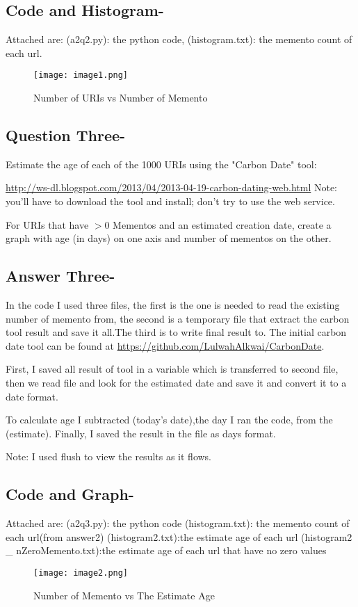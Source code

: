 \documentclass[letterpaper,11pt]{article}
\begin{document}
\subsection*{Code and Histogram-}
Attached are:
(a2q2.py): the python code,
(histogram.txt): the memento count of each url.
\pagebreak

\begin{figure}[!ht]
\centering
\texttt{[image: image1.png]}
\caption{Number of URIs vs Number of Memento}
\label{fig:Number of URIs vs Number of Memento}
\end{figure}


\pagebreak
\subsection*{Question Three-}

Estimate the age of each of the 1000 URIs using the "Carbon Date" tool:

\url{http://ws-dl.blogspot.com/2013/04/2013-04-19-carbon-dating-web.html}
Note: you'll have to download the tool and install; don't try to use the 
web service.  

For URIs that have $> 0$ Mementos and an estimated creation date,
create a graph with age (in days) on one axis and number of mementos
on the other.

\subsection*{Answer Three-}

In the code I used three files, the first is the one is needed to read the existing number of memento from, the second is a temporary file that extract the carbon tool result and save it all.The third is to write final result to.
The initial carbon date tool can be found at \url{https://github.com/LulwahAlkwai/CarbonDate}.

First, I saved all result of tool in a variable which is transferred to second file, then we read file and look for the estimated date and save it and convert it to a date format.

To calculate age I subtracted (today's date),the day I ran the code, from the (estimate). Finally, I saved the result in the file as days format.

Note: I used flush to view the results as it flows.


\subsection*{Code and Graph-}
Attached are:
(a2q3.py): the python code
(histogram.txt): the memento count of each url(from answer2)
(histogram2.txt):the estimate age of each url
(histogram2 \_ nZeroMemento.txt):the estimate age of each url that have no zero values
\pagebreak

\begin{figure}[!ht]
\centering
\texttt{[image: image2.png]}
\caption{Number of Memento vs The Estimate Age}
\label{fig:Number of Memento vs Estimate Age}
\end{figure}
\end{document}
